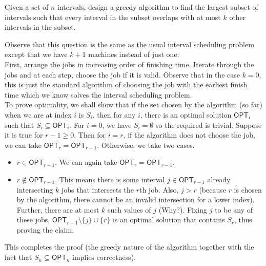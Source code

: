 \begin{exercise}
	Given a set of $n$ intervals, design a greedy algorithm to find the largest subset of intervals such that every interval in the subset overlaps with at most $k$ other intervals in the subset.
\end{exercise}
\begin{solution*}
	Observe that this question is the same as the usual interval scheduling problem except that we have $k+1$ machines instead of just one.\\
	First, arrange the jobs in increasing order of finishing time. Iterate through the jobs and at each step, choose the job if it is valid. Observe that in the case $k=0$, this is just the standard algorithm of choosing the job with the earliest finish time which we know solves the interval scheduling problem.\\
	To prove optimality, we shall show that if the set chosen by the algorithm (so far) when we are at index $i$ is $S_i$, then for any $i$, there is an optimal solution $\mathsf{OPT}_i$ such that $S_i\subseteq\mathsf{OPT}_i$. For $i=0$, we have $S_i=\emptyset$ so the required is trivial. Suppose it is true for $r-1\geq 0$. Then for $i=r$, if the algorithm does not choose the job, we can take $\mathsf{OPT}_r=\mathsf{OPT}_{r-1}$. Otherwise, we take two cases.
	\begin{itemize}
		\item $r\in\mathsf{OPT}_{r-1}$. We can again take $\mathsf{OPT}_r=\mathsf{OPT}_{r-1}$.
		\item $r\not\in\mathsf{OPT}_{r-1}$. This means there is some interval $j\in\mathsf{OPT}_{r-1}$ already intersecting $k$ jobs that intersects the $r$th job. Also, $j>r$ (because $r$ is chosen by the algorithm, there cannot be an invalid intersection for a lower index). Further, there are at most $k$ such values of $j$ (Why?). Fixing $j$ to be any of these jobs, $\mathsf{OPT}_{r-1}\setminus \{j\}\cup\{r\}$ is an optimal solution that contains $S_r$, thus proving the claim.
	\end{itemize}
	This completes the proof (the greedy nature of the algorithm together with the fact that $S_n\subseteq\mathsf{OPT}_n$ implies correctness).
\end{solution*}

